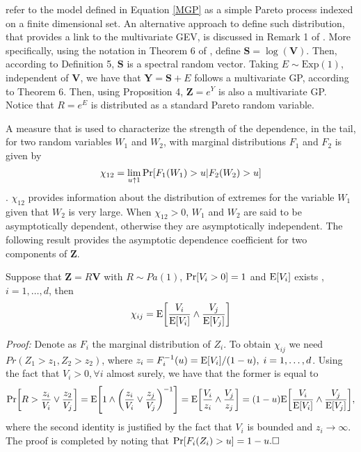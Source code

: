 \cite{ferreira2014} refer to the model defined in Equation \eqref{MGP} as a simple 
Pareto process indexed on a finite dimensional set. An alternative approach to 
define such distribution, that provides a link to the multivariate GEV, is discussed 
in Remark 1 of \cite{RoSeWa2018a}. More specifically, 
using the notation in Theorem 6 of \cite{RoSeWa2018a}, define $\bm{S} = \log(\bm{V})$. 
Then, according to Definition 5, $\bm{S}$ is a spectral random vector. Taking 
$E \sim \text{Exp}(1)$, independent of $\bm{V}$, we have that $\bm{Y} = \bm{S} + E$ 
follows a multivariate GP, according to Theorem 6.  Then, using Proposition 4, 
$\bm{Z} = e^{Y}$ is also a multivariate GP. Notice that $R = e^E$ is distributed as 
a standard Pareto random variable.

A measure that is used to characterize the strength of the dependence,
in the tail, for two random variables $W_1$ and $W_2$, with marginal
distributions $F_1$ and $F_2$ is given by
\[	\chi_{12} = \lim_{u\uparrow 1} \prob{F_1(W_1)>u|F_2(W_2)>u}  \]
\citep{coles2001}.
$\chi_{12}$ provides information about the distribution of extremes for the variable $W_1$
given that $W_2$ is very large.  When $\chi_{12}>0$, $W_1$ and $W_2$ 
are said to
be asymptotically dependent, otherwise they are asymptotically
independent. The following result provides the asymptotic dependence coefficient for two components of $\bm{Z}$. 
\begin{prop}\label{ppchi}
Suppose that $\bm{Z} = R\bm{V}$ with $R\sim Pa(1)$,
$\prob{V_i > 0} = 1$ and $\expect{V_i}$ exists ,
$i=1, \ldots ,d$, then
\begin{equation}
	\chi_{ij} = \expect{\frac{V_i}{\expect{V_i}} \wedge \frac{V_j}{\expect{V_j}}}
\end{equation}
\end{prop}
{\em Proof:}
Denote as $F_i$ the marginal distribution of $Z_i$. To obtain $\chi_{ij}$ we need $Pr(Z_1>z_1,Z_2>z_2)$, where $z_i =
F_i^{-1}(u) = \expect{V_i}/(1 - u), \;i=1,\dots, d$.
Using the fact that
$V_i>0, \forall i$ almost surely, we have that the former is equal to
\begin{equation*}
\prob{R>\frac{z_i}{V_i}\vee\frac{z_2}{V_j}}
    = \expect{1\wedge\left(\frac{z_i}{V_i}\vee\frac{z_j}{V_j}\right)^{-1}}
    = \expect{\frac{V_i}{z_i}\wedge\frac{V_j}{z_j}}
    = (1 - u)\expect{\frac{V_i}{\expect{V_i}}\wedge\frac{V_j}{\expect{V_j}}},
\end{equation*}
where the second identity is justified by the fact that $V_i$ is
bounded and $z_i\rightarrow\infty$. The proof is completed by noting
that $\prob{F_i(Z_i)>u} = 1 - u.\hfill\Box$

